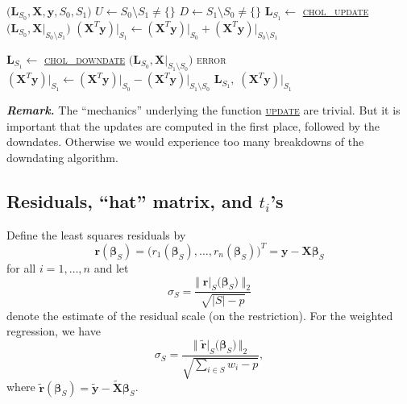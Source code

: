 \documentclass[a4paper,oneside,11pt,DIV=12]{scrartcl}
\begin{document}
\begin{algorithmic}[1]
	\hypertarget{alg:update}{}
			$\big(\bm L_{S_0}, \bm X, \bm y, S_0, S_1\big)$
		\State $U \gets S_0 \setminus S_1 \neq \{\}$
		\State $D \gets S_1 \setminus S_0 \neq \{\}$
			\State $\bm L_{S_1} \gets$
				\hyperlink{alg:cholupdate}{\textsc{chol\_update}}
				$\big( \bm L_{S_0}, \bm X \vert_{S_0 \setminus S_1}\big)$
			\State $(\bm X^T \bm y)\vert_{S_1} \gets (\bm X^T \bm y)
				\vert_{S_0} + (\bm X^T \bm y)\vert_{S_0 \setminus S_1}$
		\EndFor

			\State $\bm L_{S_1} \gets$
				\hyperlink{alg:choldowndate}{\textsc{chol\_downdate}}
				$\big( \bm L_{S_0}, \bm X \vert_{S_1 \setminus S_0}\big)$
				\State \Return \textsc{error}
			\EndIf
			\State $(\bm X^T  \bm y)\vert_{S_1} \gets (\bm X^T \bm y)
				\vert_{S_0} - (\bm X^T \bm y)\vert_{S_1 \setminus S_0}$
		\EndFor
		\State \Return $\bm L_{S_1}, \;(\bm X^T  \bm y)\vert_{S_1}$
	\EndFunction
\end{algorithmic}

\vspace{1em}
\noindent\textbf{\sffamily \small \itshape Remark.} The ``mechanics''
underlying the function \hyperlink{alg:update}{\textsc{update}} are
trivial. But it is important that the updates are computed in the first
place, followed by the downdates. Otherwise we would experience too many
breakdowns of the downdating algorithm.

\subsection{Residuals, ``hat'' matrix, and $t_i$'s}
Define the least squares residuals by
\begin{equation}\label{eq:residuals}
	\bm r(\bm \beta_S) = \big( r_1(\bm \beta_S), \ldots, r_n(\bm \beta_S)
		\big)^T = \bm y - \bm X \bm \beta_S
\end{equation}
\noindent for all $i = 1, \ldots, n$ and let
\begin{equation}\label{eq:sigma}
	\sigma_S = \frac{ \big\Vert \; \bm r \vert_S \big(\bm \beta_S) \;
		\big\Vert_2}{\sqrt{\vert S \vert - p}}
\end{equation}
\noindent denote the estimate of the residual scale (on the restriction).
For the weighted regression, we have
\begin{equation}\label{eq:sigmaw}
	\sigma_S = \frac{ \big\Vert \; \widetilde{\bm r} \vert_S
		\big(\bm \beta_S) \, \big \Vert_2}{\sqrt{ \sum_{i \in S} w_i - p}},
\end{equation}
\noindent where $\widetilde{\bm r}(\bm \beta_S) = \widetilde{\bm y} -
\widetilde{\bm X} \bm \beta_S$.
\end{document}
